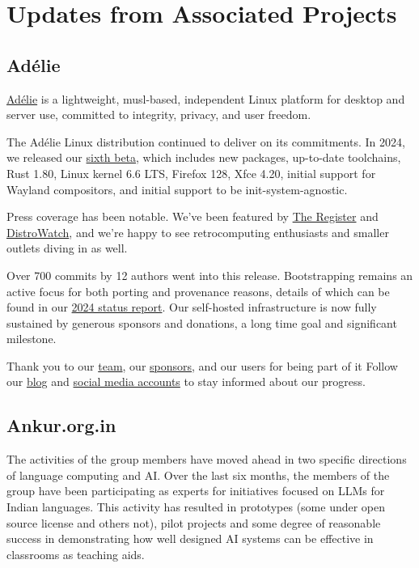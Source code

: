 \documentclass[a4paper]{report}
\begin{document}
\section{Updates from Associated Projects}

\subsection{Adélie}

\href{https://www.adelielinux.org/}{Adélie} is a lightweight, musl-based, independent Linux platform for desktop and server use, committed to integrity, privacy, and user freedom.

The Adélie Linux distribution continued to deliver on its commitments. In 2024, we released our \href{https://blog.adelielinux.org/2024/12/15/adelie-linux-1-0-beta6-released/}{sixth beta}, which includes new packages, up-to-date toolchains, Rust 1.80, Linux kernel 6.6 LTS, Firefox 128, Xfce 4.20, initial support for Wayland compositors, and initial support to be init-system-agnostic.

Press coverage has been notable. We’ve been featured by \href{https://www.theregister.com/2024/12/20/adelie_linux_1_beta_6/}{The Register} and \href{https://distrowatch.com/weekly.php?issue=20240212}{DistroWatch}, and we’re happy to see retrocomputing enthusiasts and smaller outlets diving in as well.

Over 700 commits by 12 authors went into this release. Bootstrapping remains an active focus for both porting and provenance reasons, details of which can be found in our \href{https://blog.adelielinux.org/2024/12/24/2024-state-of-the-adelie-linux-distribution/}{2024 status report}.
Our self-hosted infrastructure is now fully sustained by generous sponsors and donations, a long time goal and significant milestone.

Thank you to our \href{https://git.adelielinux.org/groups/adelie/-/group_members}{team}, our \href{https://www.adelielinux.org/sponsors/}{sponsors}, and our users for being part of it Follow our \href{https://blog.adelielinux.org/}{blog} and \href{https://www.adelielinux.org/contact/}{social media accounts} to stay informed about our progress.

\subsection{Ankur.org.in}

The activities of the group members have moved ahead in two specific directions of language computing and AI. Over the last six months, the members of the group have been participating as experts for initiatives focused on LLMs for Indian languages. This activity has resulted in prototypes (some under open source license and others not), pilot projects and some degree of reasonable success in demonstrating how well designed AI systems can be effective in classrooms as teaching aids.
\end{document}
